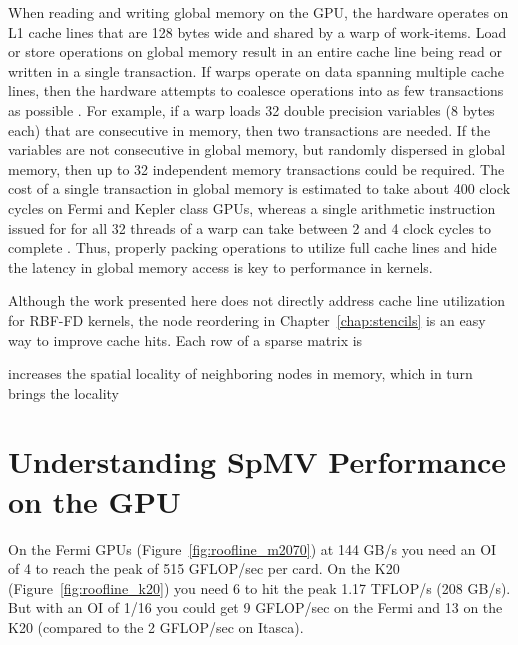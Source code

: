 \documentclass{report}
\begin{document}
When reading and writing global memory on the GPU, the hardware operates on L1 cache lines that are 128 bytes wide and shared by a warp of work-items. Load or store operations on global memory result in an entire cache line being read or written in a single transaction. If warps operate on data spanning multiple cache lines, then the hardware attempts to coalesce operations into as few transactions as possible \cite{CudaGuide2013}. For example, if a warp loads 32 double precision variables (8 bytes each) that are consecutive in memory, then two transactions are needed. If the variables are not consecutive in global memory, but randomly dispersed in global memory, then up to 32 independent memory transactions could be required. The cost of a single transaction in global memory is estimated to take about 400 clock cycles on Fermi and Kepler class GPUs, whereas a single arithmetic instruction issued for for all 32 threads of a warp can take between 2 and 4 clock cycles to complete \cite{CudaGuide2013}. Thus, properly packing operations to utilize full cache lines and hide the latency in global memory access is key to performance in kernels. 

Although the work presented here does not directly address cache line utilization for RBF-FD kernels, the node reordering in Chapter~\ref{chap:stencils} is an easy way to improve cache hits. Each row of a sparse matrix is 

increases the spatial locality of neighboring nodes in memory, which in turn brings  the locality 



\section{Understanding SpMV Performance on the GPU}

On the Fermi GPUs (Figure~\ref{fig:roofline_m2070}) at 144 GB/s you need an OI of 4 to reach the peak of 515 GFLOP/sec per card. On the K20 (Figure~\ref{fig:roofline_k20}) you need 6 to hit the peak 1.17 TFLOP/s (208 GB/s). But with an OI of 1/16 you could get 9 GFLOP/sec on the Fermi and 13 on the K20 (compared to the 2 GFLOP/sec on Itasca). 
\end{document}
